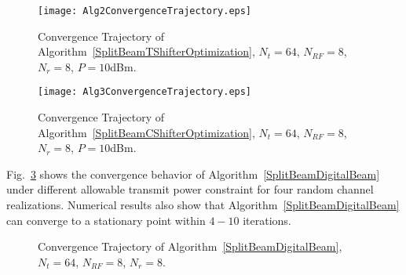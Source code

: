 \documentclass[11pt,draftcls,onecolumn]{IEEEtran}
\begin{document}
\begin{figure}[h]%
\centering
{}
\onelinecaptionstrue
\texttt{[image: Alg2ConvergenceTrajectory.eps]}\\
\caption{Convergence Trajectory of Algorithm~\ref{SplitBeamTShifterOptimization}, $N_{t}=64$, $N_{RF}=8$, $N_{r}=8$, $P=10$dBm.}
\label{Alg2ConvergenceTrajectory}
\end{figure}


\begin{figure}[h]%
\centering
{}
\onelinecaptionstrue
\texttt{[image: Alg3ConvergenceTrajectory.eps]}\\
\caption{Convergence Trajectory of Algorithm~\ref{SplitBeamCShifterOptimization}, $N_{t}=64$, $N_{RF}=8$, $N_{r}=8$, $P=10$dBm.}
\label{Alg3ConvergenceTrajectory}
\end{figure}

Fig.~\ref{Alg4ConvergenceTrajectory} shows the convergence behavior of Algorithm~\ref{SplitBeamDigitalBeam} under different allowable transmit power constraint for four random channel realizations. Numerical results also show that Algorithm~\ref{SplitBeamDigitalBeam} can converge to a stationary point within $4-10$ iterations.
\begin{figure}
\centering
{}
\onelinecaptionstrue
{}
\caption{Convergence Trajectory of Algorithm~\ref{SplitBeamDigitalBeam}, $N_{t}=64$, $N_{RF}=8$, $N_{r}=8$.}
\label{Alg4ConvergenceTrajectory}
\end{figure}
\end{document}

